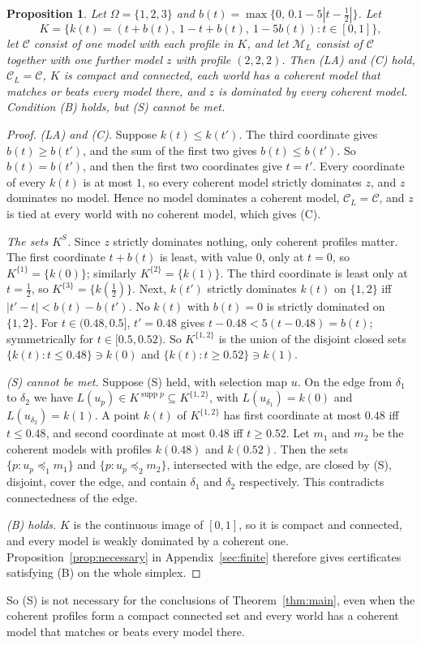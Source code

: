 \documentclass[11pt]{article}
\newtheorem{proposition}[theorem]{Proposition}
\theoremstyle{definition}
\theoremstyle{remark}
\newcommand{\M}{\mathcal M}
\newcommand{\C}{\mathcal C}
\newcommand{\supp}{\operatorname{supp}}
\begin{document}
\begin{proposition}\label{prop:threeworld}
Let $\Omega=\{1,2,3\}$ and $b(t)=\max\{0,\,0.1-5|t-\tfrac12|\}$. Let
\[
 K=\{k(t)=(t+b(t),\ 1-t+b(t),\ 1-5b(t)):t\in[0,1]\},
\]
let $\C$ consist of one model with each profile in $K$, and let $\M_L$ consist of $\C$ together with one further model $z$ with profile $(2,2,2)$. Then (LA) and (C) hold, $\C_L=\C$, $K$ is compact and connected, each world has a coherent model that matches or beats every model there, and $z$ is dominated by every coherent model. Condition (B) holds, but (S) cannot be met.
\end{proposition}
\begin{proof}
\emph{(LA) and (C).} Suppose $k(t)\le k(t')$. The third coordinate gives $b(t)\ge b(t')$, and the sum of the first two gives $b(t)\le b(t')$. So $b(t)=b(t')$, and then the first two coordinates give $t=t'$. Every coordinate of every $k(t)$ is at most $1$, so every coherent model strictly dominates $z$, and $z$ dominates no model. Hence no model dominates a coherent model, $\C_L=\C$, and $z$ is tied at every world with no coherent model, which gives (C).

\emph{The sets $K^S$.} Since $z$ strictly dominates nothing, only coherent profiles matter. The first coordinate $t+b(t)$ is least, with value $0$, only at $t=0$, so $K^{\{1\}}=\{k(0)\}$; similarly $K^{\{2\}}=\{k(1)\}$. The third coordinate is least only at $t=\tfrac12$, so $K^{\{3\}}=\{k(\tfrac12)\}$. Next, $k(t')$ strictly dominates $k(t)$ on $\{1,2\}$ iff $|t'-t|<b(t)-b(t')$. No $k(t)$ with $b(t)=0$ is strictly dominated on $\{1,2\}$. For $t\in(0.48,0.5]$, $t'=0.48$ gives $t-0.48<5(t-0.48)=b(t)$; symmetrically for $t\in[0.5,0.52)$. So $K^{\{1,2\}}$ is the union of the disjoint closed sets $\{k(t):t\le0.48\}\ni k(0)$ and $\{k(t):t\ge0.52\}\ni k(1)$.

\emph{(S) cannot be met.} Suppose (S) held, with selection map $u$. On the edge from $\delta_1$ to $\delta_2$ we have $L(u_p)\in K^{\supp p}\subseteq K^{\{1,2\}}$, with $L(u_{\delta_1})=k(0)$ and $L(u_{\delta_2})=k(1)$. A point $k(t)$ of $K^{\{1,2\}}$ has first coordinate at most $0.48$ iff $t\le0.48$, and second coordinate at most $0.48$ iff $t\ge0.52$. Let $m_1$ and $m_2$ be the coherent models with profiles $k(0.48)$ and $k(0.52)$. Then the sets $\{p:u_p\preceq_1 m_1\}$ and $\{p:u_p\preceq_2m_2\}$, intersected with the edge, are closed by (S), disjoint, cover the edge, and contain $\delta_1$ and $\delta_2$ respectively. This contradicts connectedness of the edge.

\emph{(B) holds.} $K$ is the continuous image of $[0,1]$, so it is compact and connected, and every model is weakly dominated by a coherent one. Proposition~\ref{prop:necessary} in Appendix~\ref{sec:finite} therefore gives certificates satisfying (B) on the whole simplex.
\end{proof}
So (S) is not necessary for the conclusions of Theorem~\ref{thm:main}, even when the coherent profiles form a compact connected set and every world has a coherent model that matches or beats every model there.
\end{document}
